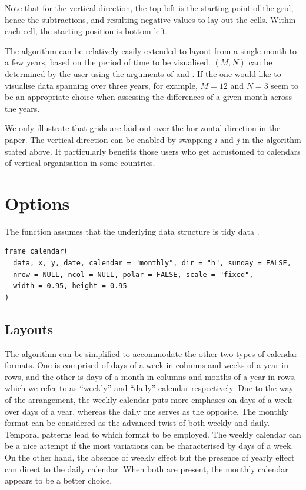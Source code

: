 \documentclass[article]{jss}
\begin{document}
Note that for the vertical direction, the top left is the starting point
of the grid, hence the subtractions, and resulting negative values to
lay out the cells. Within each cell, the starting position is bottom
left.

The algorithm can be relatively easily extended to layout from a single
month to a few years, based on the period of time to be visualised.
\((M, N)\) can be determined by the user using the arguments of
 and . If the one would like to visualise data
spanning over three years, for example, \(M = 12\) and \(N = 3\) seem to
be an appropriate choice when assessing the differences of a given month
across the years.

We only illustrate that grids are laid out over the horizontal direction
in the paper. The vertical direction can be enabled by swapping \(i\)
and \(j\) in the algorithm stated above. It particularly benefits those
users who get accustomed to calendars of vertical organisation in some
countries.

\section{Options}\label{options}

\label{sec:opt}

The  function assumes that the underlying data
structure is tidy data \citep{wickham2014tidy}.

\begin{verbatim}
frame_calendar(
  data, x, y, date, calendar = "monthly", dir = "h", sunday = FALSE, 
  nrow = NULL, ncol = NULL, polar = FALSE, scale = "fixed",
  width = 0.95, height = 0.95
)
\end{verbatim}

\subsection{Layouts}\label{layouts}

The algorithm can be simplified to accommodate the other two types of
calendar formats. One is comprised of days of a week in columns and
weeks of a year in rows, and the other is days of a month in columns and
months of a year in rows, which we refer to as ``weekly'' and ``daily''
calendar respectively. Due to the way of the arrangement, the weekly
calendar puts more emphases on days of a week over days of a year,
whereas the daily one serves as the opposite. The monthly format can be
considered as the advanced twist of both weekly and daily. Temporal
patterns lead to which format to be employed. The weekly calendar can be
a nice attempt if the most variations can be characterised by days of a
week. On the other hand, the absence of weekly effect but the presence
of yearly effect can direct to the daily calendar. When both are
present, the monthly calendar appears to be a better choice.
\end{document}
